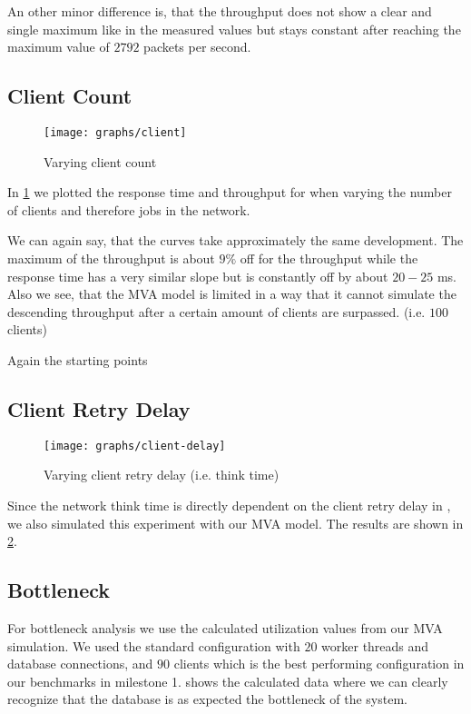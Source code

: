 \documentclass[a4paper, oneside]{csthesis}
\begin{document}
    An other minor difference is, that the throughput does not show a clear and
    single maximum like in the measured values but stays constant after reaching
    the maximum value of $2792$ packets per second.
    
    \newpage
    
\subsection{Client Count}


    \begin{figure}[th]
        \centering
            \texttt{[image: graphs/client]}
            \caption{Varying client count}
            \label{fig:clientCount}
    \end{figure}
    
    In \cref{fig:clientCount} we plotted the response time and throughput for
    \telesto{} when varying the number of clients and therefore jobs in the
    network.
    
    We can again say, that the curves take approximately the same development.
    The maximum of the throughput is about $9 \%$ off for the throughput while
    the response time has a very similar slope but is constantly off by about
    $20-25$ ms. Also we see, that the MVA model is limited in a way that it
    cannot simulate the descending throughput after a certain amount of clients
    are surpassed. (i.e. $100$ clients)
    
    Again the starting points 
    
    \newpage
    
\subsection{Client Retry Delay}
    
    
    \begin{figure}[th]
        \centering
            \texttt{[image: graphs/client-delay]}
            \caption{Varying client retry delay (i.e. think time)}
            \label{fig:retry-delay}
    \end{figure}

    Since the network think time is directly dependent on the client retry delay
    in \telesto, we also simulated this experiment with our MVA model. The
    results are shown in \cref{fig:retry-delay}.
    
    \newpage

\subsection{Bottleneck}
    For bottleneck analysis we use the calculated utilization values from our
    MVA simulation. We used the standard configuration with $20$ worker threads
    and database connections, and $90$ clients which is the best performing
    configuration in our \telesto{} benchmarks in milestone 1.
     shows the calculated data where we can clearly
    recognize that the database is as expected the bottleneck of the system.
    
\end{document}
